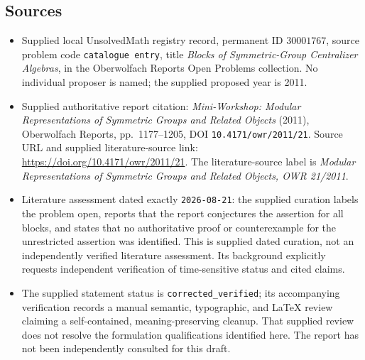 \documentclass[11pt]{article}
\begin{document}
\subsection{Sources}
\begin{itemize}
\item Supplied local UnsolvedMath registry record, permanent ID \(30001767\), source problem code \texttt{catalogue entry}, title \emph{Blocks of Symmetric-Group Centralizer Algebras}, in the Oberwolfach Reports Open Problems collection. No individual proposer is named; the supplied proposed year is 2011.
\item Supplied authoritative report citation: \emph{Mini-Workshop: Modular Representations of Symmetric Groups and Related Objects} (2011), Oberwolfach Reports, pp.~1177--1205, DOI \texttt{10.4171/owr/2011/21}. Source URL and supplied literature-source link: \url{https://doi.org/10.4171/owr/2011/21}. The literature-source label is \emph{Modular Representations of Symmetric Groups and Related Objects, OWR 21/2011}.
\item Literature assessment dated exactly \texttt{2026-08-21}: the supplied curation labels the problem open, reports that the report conjectures the assertion for all blocks, and states that no authoritative proof or counterexample for the unrestricted assertion was identified. This is supplied dated curation, not an independently verified literature assessment. Its background explicitly requests independent verification of time-sensitive status and cited claims.
\item The supplied statement status is \texttt{corrected\_verified}; its accompanying verification records a manual semantic, typographic, and LaTeX review claiming a self-contained, meaning-preserving cleanup. That supplied review does not resolve the formulation qualifications identified here. The report has not been independently consulted for this draft.
\end{itemize}
\end{document}
